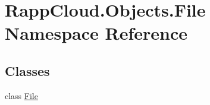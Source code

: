 \hypertarget{namespaceRappCloud_1_1Objects_1_1File}{\section{Rapp\-Cloud.\-Objects.\-File Namespace Reference}
\label{namespaceRappCloud_1_1Objects_1_1File}
}
\subsection*{Classes}
\begin{DoxyCompactItemize}
\item 
class \hyperlink{classRappCloud_1_1Objects_1_1File_1_1File}{File}
\end{DoxyCompactItemize}
